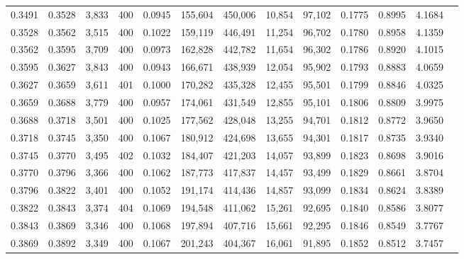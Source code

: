 \begin{tabular}{rrrrrrrrrrrrr}
0.3491 & 0.3528 &  3,833 & 400 &                                     0.0945 & 155,604 & 450,006 &  10,854 &  97,102 & 0.1775 & 0.8995 & 4.1684 \\
0.3528 & 0.3562 &  3,515 & 400 &                                     0.1022 & 159,119 & 446,491 &  11,254 &  96,702 & 0.1780 & 0.8958 & 4.1359 \\
0.3562 & 0.3595 &  3,709 & 400 &                                     0.0973 & 162,828 & 442,782 &  11,654 &  96,302 & 0.1786 & 0.8920 & 4.1015 \\
0.3595 & 0.3627 &  3,843 & 400 &                                     0.0943 & 166,671 & 438,939 &  12,054 &  95,902 & 0.1793 & 0.8883 & 4.0659 \\
0.3627 & 0.3659 &  3,611 & 401 &                                     0.1000 & 170,282 & 435,328 &  12,455 &  95,501 & 0.1799 & 0.8846 & 4.0325 \\
0.3659 & 0.3688 &  3,779 & 400 &                                     0.0957 & 174,061 & 431,549 &  12,855 &  95,101 & 0.1806 & 0.8809 & 3.9975 \\
0.3688 & 0.3718 &  3,501 & 400 &                                     0.1025 & 177,562 & 428,048 &  13,255 &  94,701 & 0.1812 & 0.8772 & 3.9650 \\
0.3718 & 0.3745 &  3,350 & 400 &                                     0.1067 & 180,912 & 424,698 &  13,655 &  94,301 & 0.1817 & 0.8735 & 3.9340 \\
0.3745 & 0.3770 &  3,495 & 402 &                                     0.1032 & 184,407 & 421,203 &  14,057 &  93,899 & 0.1823 & 0.8698 & 3.9016 \\
0.3770 & 0.3796 &  3,366 & 400 &                                     0.1062 & 187,773 & 417,837 &  14,457 &  93,499 & 0.1829 & 0.8661 & 3.8704 \\
0.3796 & 0.3822 &  3,401 & 400 &                                     0.1052 & 191,174 & 414,436 &  14,857 &  93,099 & 0.1834 & 0.8624 & 3.8389 \\
0.3822 & 0.3843 &  3,374 & 404 &                                     0.1069 & 194,548 & 411,062 &  15,261 &  92,695 & 0.1840 & 0.8586 & 3.8077 \\
0.3843 & 0.3869 &  3,346 & 400 &                                     0.1068 & 197,894 & 407,716 &  15,661 &  92,295 & 0.1846 & 0.8549 & 3.7767 \\
0.3869 & 0.3892 &  3,349 & 400 &                                     0.1067 & 201,243 & 404,367 &  16,061 &  91,895 & 0.1852 & 0.8512 & 3.7457 \\

\end{tabular}
